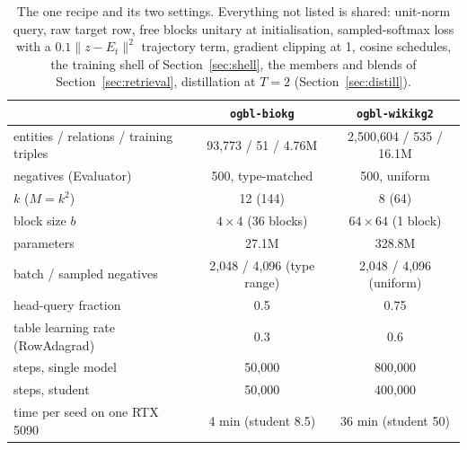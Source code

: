 \documentclass[11pt,a4paper]{article}
\begin{document}
\begin{table}[t]
\centering
\caption{The one recipe and its two settings. Everything not listed is
shared: unit-norm query, raw target row, free blocks unitary at
initialisation, sampled-softmax loss with a $0.1\lVert z-E_t\rVert^2$
trajectory term, gradient clipping at 1, cosine schedules, the training
shell of Section~\ref{sec:shell}, the members and blends of
Section~\ref{sec:retrieval}, distillation at $T=2$
(Section~\ref{sec:distill}).}
\label{tab:dials}
\small
\begin{tabular}{lcc}
\toprule
 & \texttt{ogbl-biokg} & \texttt{ogbl-wikikg2} \\
\midrule
entities / relations / training triples & 93{,}773 / 51 / 4.76M & 2{,}500{,}604 / 535 / 16.1M \\
negatives (Evaluator) & 500, type-matched & 500, uniform \\
$k$ ($M=k^2$) & 12 (144) & 8 (64) \\
block size $b$ & $4\times4$ (36 blocks) & $64\times64$ (1 block) \\
parameters & 27.1M & 328.8M \\
batch / sampled negatives & 2{,}048 / 4{,}096 (type range) & 2{,}048 / 4{,}096 (uniform) \\
head-query fraction & 0.5 & 0.75 \\
table learning rate (RowAdagrad) & 0.3 & 0.6 \\
steps, single model & 50{,}000 & 800{,}000 \\
steps, student & 50{,}000 & 400{,}000 \\
time per seed on one RTX 5090 & 4 min (student 8.5) & 36 min (student 50) \\
\bottomrule
\end{tabular}
\end{table}
\end{document}
